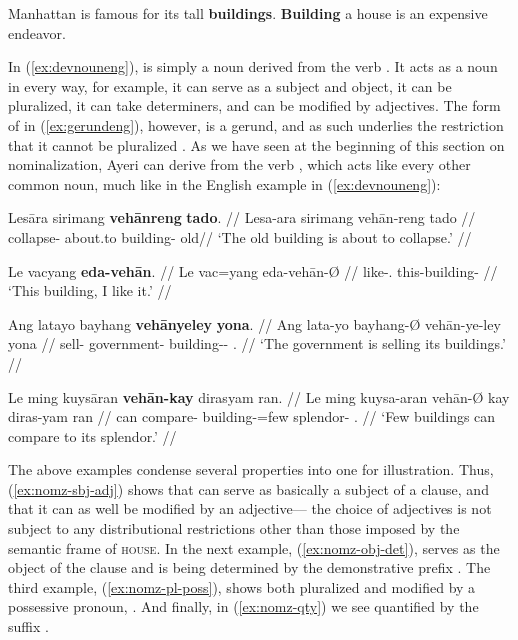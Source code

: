\pex
	\a\label{ex:devnouneng} Manhattan is famous for its tall 
		\textbf{buildings}.
	\a\label{ex:gerundeng} \textbf{Building} a house is an expensive 
		endeavor.
\xe

In (\ref{ex:devnouneng}),  is simply a noun derived from the verb 
. It acts as a noun in every way, for example, it can serve as a 
subject and object, it can be pluralized, it can take determiners, and can be 
modified by adjectives. The form of  in (\ref{ex:gerundeng}), 
however, is a gerund, and as such underlies the restriction that it cannot be 
pluralized \citep[35]{payne1997}. As we have seen at the beginning of this 
section on nominalization, Ayeri can derive  from the verb , which acts like every 
other common noun, much like in the English example in (\ref{ex:devnouneng}):

\pex
\a\label{ex:nomz-sbj-adj}\begingl
	\gla Lesāra sirimang \textbf{vehānreng} \textbf{tado}. //
	\glb Lesa-ara sirimang vehān-reng tado //
	\glc collapse-\TsgI{} about.to building-\AargI{} old//
	\glft `The old building is about to collapse.' //
\endgl

\a\label{ex:nomz-obj-det}\begingl
	\gla Le vacyang \textbf{eda-vehān}. //
	\glb Le vac=yang eda-vehān-Ø //
	\glc \PatTI{} like-\Fsg{}.\Aarg{} this-building-\Top{} //
	\glft `This building, I like it.' //
\endgl

\a\label{ex:nomz-pl-poss}\begingl
	\gla Ang latayo bayhang \textbf{vehānyeley} \textbf{yona}. //
	\glb Ang lata-yo bayhang-Ø vehān-ye-ley yona //
	\glc \AgtT{} sell-\TsgN{} government-\Top{} 
		building-\Pl{}-\PargI{} \TsgN{}.\Gen{} //
	\glft `The government is selling its buildings.' //
\endgl

\a\label{ex:nomz-qty}\begingl
	\gla Le ming kuysāran \textbf{vehān-kay} dirasyam ran. //
	\glb Le ming kuysa-aran vehān-Ø kay diras-yam ran //
	\glc \PatTI{} can compare-\TplI{} building-\Top=few 
		splendor-\Dat{} \TsgI{}.\Gen{} //
	\glft `Few buildings can compare to its splendor.' //
\endgl
\xe

The above examples condense several properties into one for illustration. Thus,
(\ref{ex:nomz-sbj-adj}) shows that  can serve as basically
a subject of a clause, and that it can as well be modified by an adjective---
the choice of adjectives is not subject to any distributional restrictions
other than those imposed by the semantic frame of
\textsc{house}. In the next example, (\ref{ex:nomz-obj-det}), 
 serves as the object of the clause and is being 
determined by the demonstrative prefix . The third 
example, (\ref{ex:nomz-pl-poss}), shows  both pluralized 
and modified by a possessive pronoun, . And finally, in 
(\ref{ex:nomz-qty}) we see  quantified by the suffix 
.

